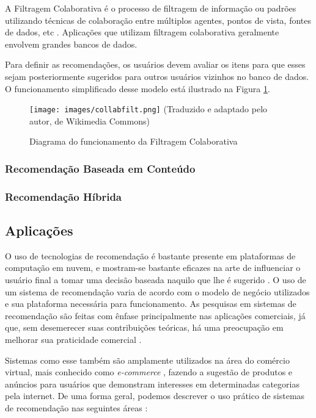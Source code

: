 \documentclass[
	12pt,				%
	a4paper,			%
	english,			%
	french,				%
	spanish,			%
	brazil				%
	]{abntex2}
\begin{document}
A Filtragem Colaborativa é o processo de filtragem de informação ou padrões utilizando técnicas de colaboração entre múltiplos agentes, pontos de vista, fontes de dados, etc \cite{terveen2001beyond}. Aplicações que utilizam filtragem colaborativa geralmente envolvem grandes bancos de dados.

Para definir as recomendações, os usuários devem avaliar os itens \cite{herlocker2004evaluating} para que esses sejam posteriormente sugeridos para outros usuários vizinhos no banco de dados. O funcionamento simplificado desse modelo está ilustrado na Figura \ref{fig:collabfilt}.

\begin{figure}[H]
    \centering
    \caption{Diagrama do funcionamento da Filtragem Colaborativa}
    \texttt{[image: images/collabfilt.png]}
    \label{fig:collabfilt}
    \textual (Traduzido e adaptado pelo autor, de Wikimedia Commons)
\end{figure}

\subsubsection{Recomendação Baseada em Conteúdo}

\subsubsection{Recomendação Híbrida}

\subsection{Aplicações}

O uso de tecnologias de recomendação é bastante presente em plataformas de computação em nuvem, e mostram-se bastante eficazes na arte de influenciar o usuário final a tomar uma decisão baseada naquilo que lhe é sugerido \cite{shani2011evaluating}. O uso de um sistema de recomendação varia de acordo com o modelo de negócio utilizados e sua plataforma necessária para funcionamento. As pesquisas em sistemas de recomendação são feitas com ênfase principalmente nas aplicações comerciais, já que, sem desemerecer suas contribuições teóricas, há uma preocupação em melhorar sua praticidade comercial \cite{ricci2011introduction}.

Sistemas como esse também são amplamente utilizados na área do comércio virtual, mais conhecido como \emph{e-commerce} \cite{sarwar2002recommender}, fazendo a sugestão de produtos e anúncios para usuários que demonstram interesses em determinadas categorias pela internet. De uma forma geral, podemos descrever o uso prático de sistemas de recomendação nas seguintes áreas \cite{ricci2011introduction}:
\end{document}
